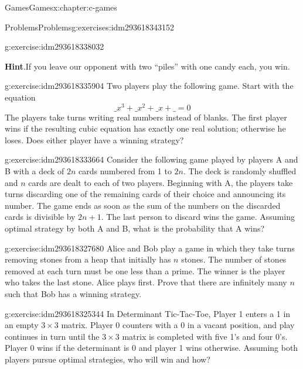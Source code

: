 \documentclass[twoside,10pt,]{book}
\newcommand{\blocktitlefont}{\relax}
\numberwithin{equation}{section}
\begin{document}
\begin{chapterptx}{Games}{}{Games}{}{}{x:chapter:c-games}
\begin{exercises-section}{Problems}{}{Problems}{}{}{g:exercises:idm293618343152}
\begin{divisionexercise}{3}{}{}{g:exercise:idm293618338032}
\par\smallskip%
\noindent\textbf{\blocktitlefont Hint}.\label{g:hint:idm293618336752}{}\hypertarget{g:hint:idm293618336752}{}\quad{}If you leave our opponent with two ``piles'' with one candy each, you win.%
\end{divisionexercise}%
\begin{divisionexercise}{4}{}{}{g:exercise:idm293618335904}%
Two players play the following game. Start with the equation%
\begin{equation*}
\_ x^3 + \_ x^2 + \_ x + \_= 0
\end{equation*}
The players take turns writing real numbers instead of blanks. The first player wins if the resulting cubic equation has exactly one real solution; otherwise he loses. Does either player have a winning strategy?%
\end{divisionexercise}%
\begin{divisionexercise}{5}{}{}{g:exercise:idm293618333664}%
Consider the following game played by players A and B with a deck of \(2n\) cards numbered from 1 to \(2n\). The deck is randomly shuffled and \(n\) cards are dealt to each of two players. Beginning with A, the players take turns discarding one of the remaining cards of their choice and announcing its number. The game ends as soon as the sum of the numbers on the discarded cards is divisible by \(2n + 1\). The last person to discard wins the game. Assuming optimal strategy by both A and B, what is the probability that A wins?%
\end{divisionexercise}%
\begin{divisionexercise}{6}{}{}{g:exercise:idm293618327680}%
Alice and Bob play a game in which they take turns removing stones from a heap that initially has \(n\) stones. The number of stones removed at each turn must be one less than a prime. The winner is the player who takes the last stone. Alice plays first. Prove that there are infinitely many \(n\) such that Bob has a winning strategy.%
\end{divisionexercise}%
\begin{divisionexercise}{7}{}{}{g:exercise:idm293618325344}%
In  Determinant Tic-Tac-Toe, Player 1 enters a 1 in an empty \(3\times 3\) matrix. Player 0 counters with a 0 in a vacant position, and play continues in turn until the \(3 \times  3\) matrix is completed with five 1's and four 0's. Player 0 wins if the determinant is 0 and player 1 wins otherwise. Assuming both players pursue optimal strategies, who will win and how?%
\end{divisionexercise}%

\end{exercises-section}
\end{chapterptx}
\end{document}
